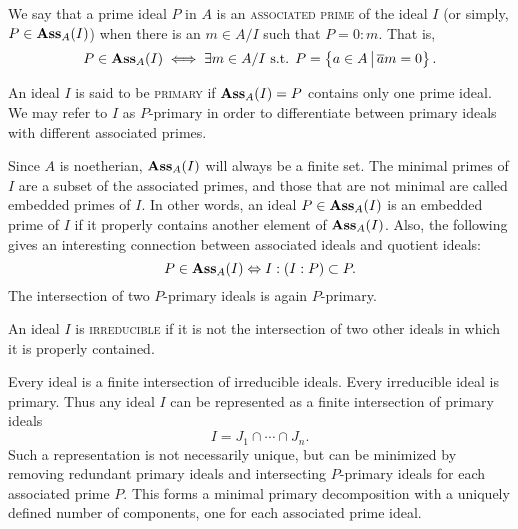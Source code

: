 \documentclass[12pt]{article}
\newcommand{\Emph}[1]{\textsc{#1}}
\begin{document}
\begin{definition}
We say that a prime ideal $P$ in $A$ is an \Emph{associated prime} of the ideal $I$ (or simply, $P \in \textbf{Ass}_A(I)$) when there is an $m \in A/I$ such that $P = 0:m$. That is,
\[
P \in \textbf{Ass}_A(I) \iff \exists m \in A/I \text{ s.t. } P = \left\{ a \in A \, \big{|} \, \overline am=0 \right\} .
\]
\end{definition}

\begin{definition}[primary]
An ideal $I$ is said to be \Emph{primary} if $\textbf{Ass}_A(I)={P}$ contains only one prime ideal.  We may refer to $I$ as $P$-primary in order to differentiate between primary ideals with different associated primes.  
\end{definition}

\begin{remark}
Since $A$ is noetherian, $\textbf{Ass}_A(I)$ will always be a finite set.  The minimal primes of $I$ are a subset of the associated primes, and those that are not minimal are called embedded primes of $I$.  In other words, an ideal $P\in \textbf{Ass}_A(I)$ is an embedded prime of $I$ if it properly contains another element of $\textbf{Ass}_A(I)$.  Also, the following gives an interesting connection between associated ideals and quotient ideals: 
\[
P\in\textbf{Ass}_A(I) \Leftrightarrow I:(I:P)\subset P.
\]
The intersection of two $P$-primary ideals is again $P$-primary.
\end{remark}

\begin{definition}
An ideal $I$ is \Emph{irreducible} if it is not the intersection of two other ideals in which it is properly contained.  
\end{definition}

\begin{proposition}[]
\end{proposition}

\begin{theorem}
Every ideal is a finite intersection of irreducible ideals.  Every irreducible ideal is primary.  Thus any ideal $I$ can be represented as a finite intersection of primary ideals
\[
 I=J_1\cap\cdots \cap J_n.
 \]
Such a representation is not necessarily unique, but can be minimized by removing redundant primary ideals and intersecting $P$-primary ideals for each associated prime $P$.  This forms a minimal primary decomposition with a uniquely defined number of components, one for each associated prime ideal.
\end{theorem}
\end{document}
